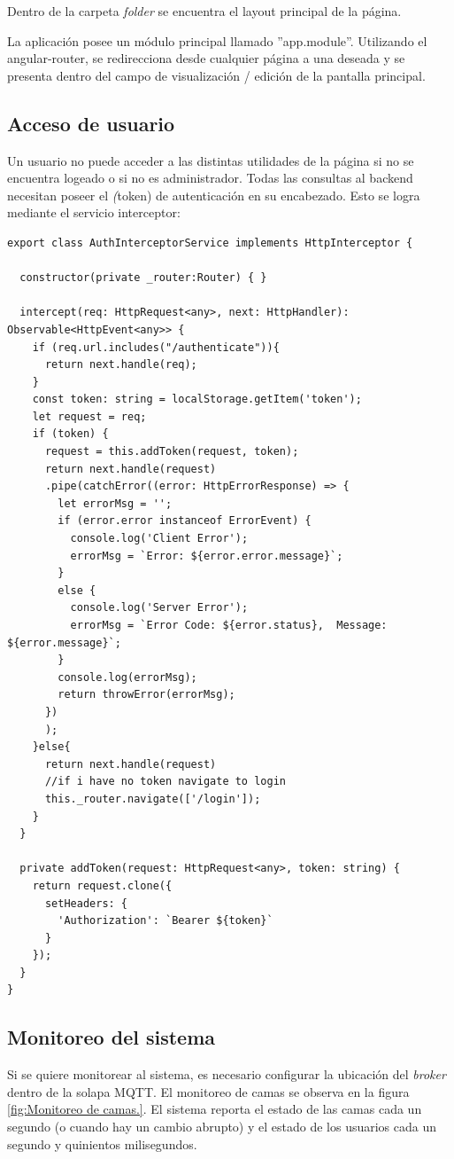 Dentro de la carpeta \textit{folder} se encuentra el layout principal de la página.

La aplicación posee un módulo principal llamado ''app.module''. Utilizando el angular-router, se redirecciona desde cualquier página a una deseada y se presenta dentro del campo de visualización / edición de la pantalla principal. 



\subsection{Acceso de usuario}

Un usuario no puede acceder a las distintas utilidades de la página si no se encuentra logeado o si no es administrador. Todas las consultas al backend necesitan poseer el \textit(token) de autenticación en su encabezado. Esto se logra mediante el servicio interceptor:


\begin{lstlisting}[caption=  Inserción de token]
export class AuthInterceptorService implements HttpInterceptor {

  constructor(private _router:Router) { }

  intercept(req: HttpRequest<any>, next: HttpHandler): Observable<HttpEvent<any>> {
    if (req.url.includes("/authenticate")){
      return next.handle(req);
    }
    const token: string = localStorage.getItem('token');
    let request = req;
	if (token) {
      request = this.addToken(request, token);
      return next.handle(request)
      .pipe(catchError((error: HttpErrorResponse) => {
        let errorMsg = '';
        if (error.error instanceof ErrorEvent) {
          console.log('Client Error');
          errorMsg = `Error: ${error.error.message}`;
        }
        else {
          console.log('Server Error');
          errorMsg = `Error Code: ${error.status},  Message: ${error.message}`;
        }
        console.log(errorMsg);
        return throwError(errorMsg);
      })
      );
    }else{
      return next.handle(request)
      //if i have no token navigate to login
      this._router.navigate(['/login']);
    }    
  }

  private addToken(request: HttpRequest<any>, token: string) {
    return request.clone({
      setHeaders: {
        'Authorization': `Bearer ${token}`
      }
    });
  }
}

\end{lstlisting}

\subsection{Monitoreo del sistema}
Si se quiere monitorear al sistema, es necesario configurar la ubicación del \textit{broker} dentro de la solapa MQTT. El monitoreo de camas se observa en la figura \ref{fig:Monitoreo de camas.}. El sistema reporta el estado de las camas cada un segundo (o cuando hay un cambio abrupto) y el estado de los usuarios cada un segundo y quinientos milisegundos.

